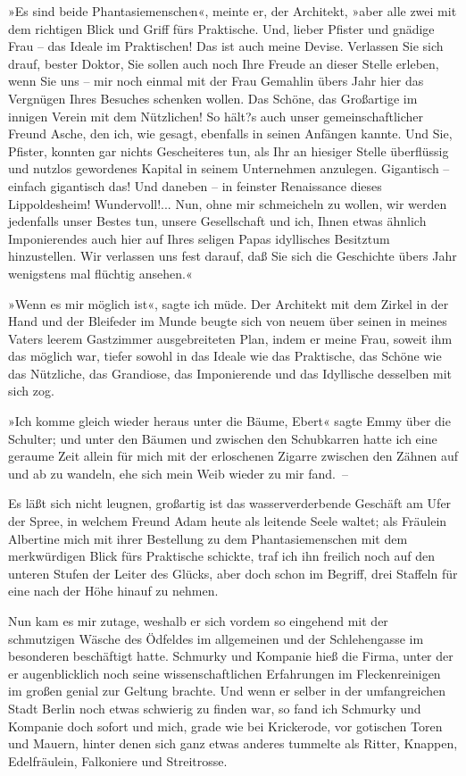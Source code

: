 »Es sind beide Phantasiemenschen«, meinte er, der Architekt, »aber
alle zwei mit dem richtigen Blick und Griff fürs Praktische. Und,
lieber Pfister und gnädige Frau – das Ideale im Praktischen! Das
ist auch meine Devise. Verlassen Sie sich drauf, bester Doktor, Sie
sollen auch noch Ihre Freude an dieser Stelle erleben, wenn Sie uns
– mir noch einmal mit der Frau Gemahlin übers Jahr hier das
Vergnügen Ihres Besuches schenken wollen. Das Schöne, das
Großartige im innigen Verein mit dem Nützlichen! So hält?s auch
unser gemeinschaftlicher Freund Asche, den ich, wie gesagt,
ebenfalls in seinen Anfängen kannte. Und Sie, Pfister, konnten gar
nichts Gescheiteres tun, als Ihr an hiesiger Stelle überflüssig und
nutzlos gewordenes Kapital in seinem Unternehmen anzulegen.
Gigantisch – einfach gigantisch das! Und daneben – in feinster
Renaissance dieses Lippoldesheim! Wundervoll!... Nun, ohne mir
schmeicheln zu wollen, wir werden jedenfalls unser Bestes tun,
unsere Gesellschaft und ich, Ihnen etwas ähnlich Imponierendes auch
hier auf Ihres seligen Papas idyllisches Besitztum hinzustellen.
Wir verlassen uns fest darauf, daß Sie sich die Geschichte übers
Jahr wenigstens mal flüchtig ansehen.«

»Wenn es mir möglich ist«, sagte ich müde. Der Architekt mit dem
Zirkel in der Hand und der Bleifeder im Munde beugte sich von neuem
über seinen in meines Vaters leerem Gastzimmer ausgebreiteten Plan,
indem er meine Frau, soweit ihm das möglich war, tiefer sowohl in
das Ideale wie das Praktische, das Schöne wie das Nützliche, das
Grandiose, das Imponierende und das Idyllische desselben mit sich
zog.

»Ich komme gleich wieder heraus unter die Bäume, Ebert« sagte Emmy
über die Schulter; und unter den Bäumen und zwischen den
Schubkarren hatte ich eine geraume Zeit allein für mich mit der
erloschenen Zigarre zwischen den Zähnen auf und ab zu wandeln, ehe
sich mein Weib wieder zu mir fand.~–

Es läßt sich nicht leugnen, großartig ist das wasserverderbende
Geschäft am Ufer der Spree, in welchem Freund Adam heute als
leitende Seele waltet; als Fräulein Albertine mich mit ihrer
Bestellung zu dem Phantasiemenschen mit dem merkwürdigen Blick fürs
Praktische schickte, traf ich ihn freilich noch auf den unteren
Stufen der Leiter des Glücks, aber doch schon im Begriff, drei
Staffeln für eine nach der Höhe hinauf zu nehmen.

Nun kam es mir zutage, weshalb er sich vordem so eingehend mit der
schmutzigen Wäsche des Ödfeldes im allgemeinen und der
Schlehengasse im besonderen beschäftigt hatte. Schmurky und
Kompanie hieß die Firma, unter der er augenblicklich noch seine
wissenschaftlichen Erfahrungen im Fleckenreinigen im großen genial
zur Geltung brachte. Und wenn er selber in der umfangreichen Stadt
Berlin noch etwas schwierig zu finden war, so fand ich Schmurky und
Kompanie doch sofort und mich, grade wie bei Krickerode, vor
gotischen Toren und Mauern, hinter denen sich ganz etwas anderes
tummelte als Ritter, Knappen, Edelfräulein, Falkoniere und
Streitrosse.

